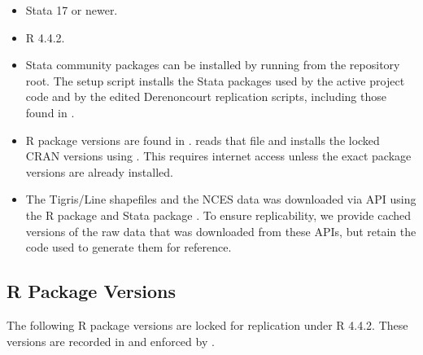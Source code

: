 \documentclass[11pt]{article}
\begin{document}
\begin{itemize}
  \item Stata 17 or newer.
  \item R 4.4.2.
  \item Stata community packages can be installed by running  from the repository root. The setup script installs the Stata packages used by the active project code and by the edited Derenoncourt replication scripts, including those found in .
  \item R package versions are found in .  reads that file and installs the locked CRAN versions using . This requires internet access unless the exact package versions are already installed.
  \item The Tigris/Line shapefiles and the NCES data was downloaded via API using the R package  and Stata package . To ensure replicability, we provide cached versions of the raw data that was downloaded from these APIs, but retain the code used to generate them for reference.
\end{itemize}

\subsection*{R Package Versions}

The following R package versions are locked for replication under R 4.4.2. These versions are recorded in  and enforced by .
\end{document}
